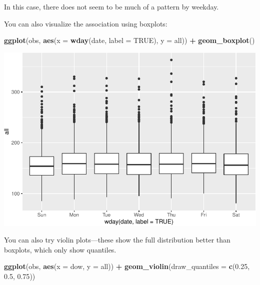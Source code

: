\documentclass[
]{book}
\newenvironment{Shaded}{\begin{snugshade}}{\end{snugshade}}
\newcommand{\DataTypeTok}[1]{\textcolor[rgb]{0.13,0.29,0.53}{#1}}
\newcommand{\FloatTok}[1]{\textcolor[rgb]{0.00,0.00,0.81}{#1}}
\newcommand{\KeywordTok}[1]{\textcolor[rgb]{0.13,0.29,0.53}{\textbf{#1}}}
\newcommand{\NormalTok}[1]{#1}
\newcommand{\OperatorTok}[1]{\textcolor[rgb]{0.81,0.36,0.00}{\textbf{#1}}}
\newcommand{\OtherTok}[1]{\textcolor[rgb]{0.56,0.35,0.01}{#1}}
\newcommand{\StringTok}[1]{\textcolor[rgb]{0.31,0.60,0.02}{#1}}
\begin{document}
In this case, there does not seem to be much of a pattern by weekday.

You can also visualize the association using boxplots:

\begin{Shaded}
\begin{Highlighting}[]
\KeywordTok{ggplot}\NormalTok{(obs, }\KeywordTok{aes}\NormalTok{(}\DataTypeTok{x =} \KeywordTok{wday}\NormalTok{(date, }\DataTypeTok{label =} \OtherTok{TRUE}\NormalTok{), }\DataTypeTok{y =}\NormalTok{ all)) }\OperatorTok{+}\StringTok{ }
\StringTok{  }\KeywordTok{geom_boxplot}\NormalTok{()}
\end{Highlighting}
\end{Shaded}

\includegraphics{adv_epi_analysis_files/figure-latex/unnamed-chunk-19-1.pdf}

You can also try violin plots---these show the full distribution better than
boxplots, which only show quantiles.

\begin{Shaded}
\begin{Highlighting}[]
\KeywordTok{ggplot}\NormalTok{(obs, }\KeywordTok{aes}\NormalTok{(}\DataTypeTok{x =}\NormalTok{ dow, }\DataTypeTok{y =}\NormalTok{ all)) }\OperatorTok{+}\StringTok{ }
\StringTok{  }\KeywordTok{geom_violin}\NormalTok{(}\DataTypeTok{draw_quantiles =} \KeywordTok{c}\NormalTok{(}\FloatTok{0.25}\NormalTok{, }\FloatTok{0.5}\NormalTok{, }\FloatTok{0.75}\NormalTok{))}
\end{Highlighting}
\end{Shaded}
\end{document}
